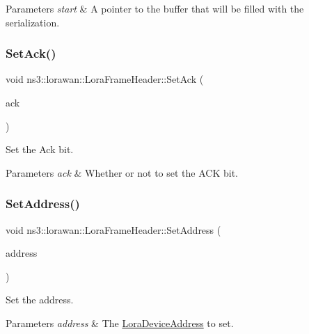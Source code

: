 \begin{DoxyParams}{Parameters}
{\em start} & A pointer to the buffer that will be filled with the serialization. \\
\hline
\end{DoxyParams}
\mbox{\label{classns3_1_1lorawan_1_1LoraFrameHeader_a4a7c35d0c20670d6e4471e56b51c3c8f}} 
\subsubsection{\texorpdfstring{Set\+Ack()}{SetAck()}}
{\footnotesize\ttfamily void ns3\+::lorawan\+::\+Lora\+Frame\+Header\+::\+Set\+Ack (\begin{DoxyParamCaption}\item[{bool}]{ack }\end{DoxyParamCaption})}

Set the Ack bit.


\begin{DoxyParams}{Parameters}
{\em ack} & Whether or not to set the A\+CK bit. \\
\hline
\end{DoxyParams}
\mbox{\label{classns3_1_1lorawan_1_1LoraFrameHeader_a65a8f5de3c705d18df13171c680e133f}} 
\subsubsection{\texorpdfstring{Set\+Address()}{SetAddress()}}
{\footnotesize\ttfamily void ns3\+::lorawan\+::\+Lora\+Frame\+Header\+::\+Set\+Address (\begin{DoxyParamCaption}\item[{\hyperlink{classns3_1_1lorawan_1_1LoraDeviceAddress}{Lora\+Device\+Address}}]{address }\end{DoxyParamCaption})}

Set the address.


\begin{DoxyParams}{Parameters}
{\em address} & The \hyperlink{classns3_1_1lorawan_1_1LoraDeviceAddress}{Lora\+Device\+Address} to set. \\
\hline
\end{DoxyParams}
\mbox{\label{classns3_1_1lorawan_1_1LoraFrameHeader_a55264b1b0ff05231d142164a7b5a43b2}} 
